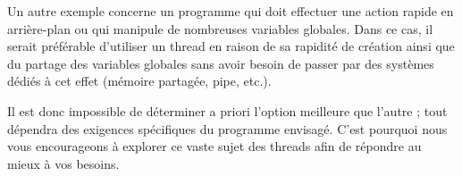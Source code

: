 Un autre exemple concerne un programme qui doit effectuer une action rapide en arrière-plan ou qui manipule de nombreuses variables globales. Dans ce cas, il serait préférable d'utiliser un thread en raison de sa rapidité de création ainsi que du partage des variables globales sans avoir besoin de passer par des systèmes dédiés à cet effet (mémoire partagée, pipe, etc.).

Il est donc impossible de déterminer a priori l'option meilleure que l'autre ; tout dépendra des exigences spécifiques du programme envisagé. C'est pourquoi nous vous encourageons à explorer ce vaste sujet des threads afin de répondre au mieux à vos besoins.
